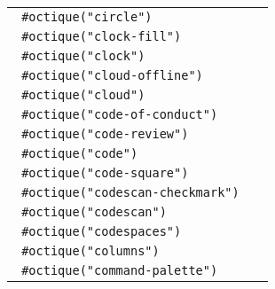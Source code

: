 \begin{longtable}[]{@{}lc@{}}
\texttt{\ \#octique("circle")\ } &
\pandocbounded{} \\
\texttt{\ \#octique("clock-fill")\ } &
\pandocbounded{} \\
\texttt{\ \#octique("clock")\ } &
\pandocbounded{} \\
\texttt{\ \#octique("cloud-offline")\ } &
\pandocbounded{} \\
\texttt{\ \#octique("cloud")\ } &
\pandocbounded{} \\
\texttt{\ \#octique("code-of-conduct")\ } &
\pandocbounded{} \\
\texttt{\ \#octique("code-review")\ } &
\pandocbounded{} \\
\texttt{\ \#octique("code")\ } &
\pandocbounded{} \\
\texttt{\ \#octique("code-square")\ } &
\pandocbounded{} \\
\texttt{\ \#octique("codescan-checkmark")\ } &
\pandocbounded{} \\
\texttt{\ \#octique("codescan")\ } &
\pandocbounded{} \\
\texttt{\ \#octique("codespaces")\ } &
\pandocbounded{} \\
\texttt{\ \#octique("columns")\ } &
\pandocbounded{} \\
\texttt{\ \#octique("command-palette")\ } &
\pandocbounded{} \\

\end{longtable}
